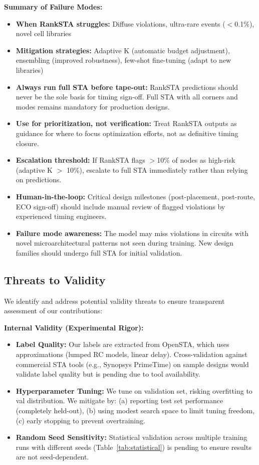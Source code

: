 \documentclass[10pt,twocolumn,journal]{IEEEtran}
\begin{document}
\textbf{Summary of Failure Modes:}
\begin{itemize}
    \item \textbf{When RankSTA struggles:} Diffuse violations, ultra-rare events ($<$0.1\%), novel cell libraries
    \item \textbf{Mitigation strategies:} Adaptive K (automatic budget adjustment), ensembling (improved robustness), few-shot fine-tuning (adapt to new libraries)
    \item \textbf{Always run full STA before tape-out:} RankSTA predictions should never be the sole basis for timing sign-off. Full STA with all corners and modes remains mandatory for production designs.
    \item \textbf{Use for prioritization, not verification:} Treat RankSTA outputs as guidance for where to focus optimization efforts, not as definitive timing closure.
    \item \textbf{Escalation threshold:} If RankSTA flags $>$10\% of nodes as high-risk (adaptive K $>$ 10\%), escalate to full STA immediately rather than relying on predictions.
    \item \textbf{Human-in-the-loop:} Critical design milestones (post-placement, post-route, ECO sign-off) should include manual review of flagged violations by experienced timing engineers.
    \item \textbf{Failure mode awareness:} The model may miss violations in circuits with novel microarchitectural patterns not seen during training. New design families should undergo full STA for initial validation.
\end{itemize}

\subsection{Threats to Validity}

We identify and address potential validity threats to ensure transparent assessment of our contributions:

\textbf{Internal Validity (Experimental Rigor):}
\begin{itemize}
    \item \textbf{Label Quality:} Our labels are extracted from OpenSTA, which uses approximations (lumped RC models, linear delay). Cross-validation against commercial STA tools (e.g., Synopsys PrimeTime) on sample designs would validate label quality but is pending due to tool availability.
    
    \item \textbf{Hyperparameter Tuning:} We tune on validation set, risking overfitting to val distribution. We mitigate by: (a) reporting test set performance (completely held-out), (b) using modest search space to limit tuning freedom, (c) early stopping to prevent overtraining.
    
    \item \textbf{Random Seed Sensitivity:} Statistical validation across multiple training runs with different seeds (Table~\ref{tab:statistical}) is pending to ensure results are not seed-dependent.
\end{itemize}
\end{document}

